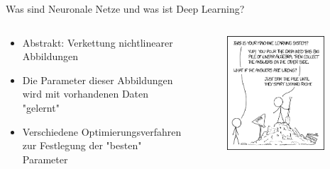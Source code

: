 \documentclass[aspectratio=1610, xcolor=dvipsnames, 9pt]{beamer}
\begin{document}
  \begin{frame}{Was sind Neuronale Netze und was ist Deep Learning?}
        \begin{columns}
          \begin{column}{0.7\textwidth}
            \begin{itemize}
              \item Abstrakt: Verkettung nichtlinearer Abbildungen \newline
              \item Die Parameter dieser Abbildungen wird mit vorhandenen Daten "gelernt" \newline
              \item Verschiedene Optimierungsverfahren zur Festlegung der "besten" Parameter \newline
            \end{itemize}
          \end{column}
          \begin{column}{0.3\textwidth}
       \begin{figure}
       \centering
                   \includegraphics[width=0.9\textwidth]{images/machine_learning.png}
       \end{figure}
          \end{column}
        \end{columns}
      \end{frame}
\end{document}
